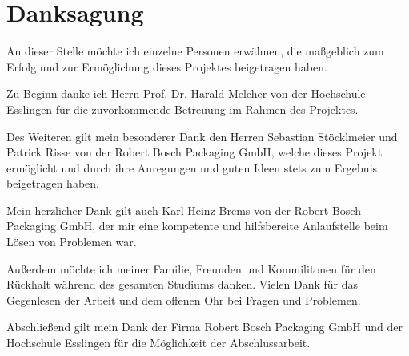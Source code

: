 \chapter*{Danksagung}
\thispagestyle{empty}

An dieser Stelle möchte ich einzelne Personen erwähnen, die maßgeblich zum Erfolg und zur Ermöglichung dieses Projektes
beigetragen haben.

Zu Beginn danke ich Herrn Prof. Dr. Harald Melcher von der Hochschule Esslingen für die zuvorkommende Betreuung im Rahmen
des Projektes.

Des Weiteren gilt mein besonderer Dank den Herren Sebastian Stöcklmeier und Patrick Risse von der Robert Bosch Packaging
GmbH, welche dieses Projekt ermöglicht und durch ihre Anregungen und guten Ideen stets zum Ergebnis beigetragen haben.

Mein herzlicher Dank gilt auch Karl-Heinz Brems von der Robert Bosch Packaging GmbH, der mir eine kompetente und
hilfsbereite Anlaufstelle beim Lösen von Problemen war.

Außerdem möchte ich meiner Familie, Freunden und Kommilitonen für den Rückhalt während des gesamten Studiums danken.
Vielen Dank für das Gegenlesen der Arbeit und dem offenen Ohr bei Fragen und Problemen.

Abschließend gilt mein Dank der Firma Robert Bosch Packaging GmbH und der Hochschule Esslingen für die Möglichkeit der
Abschlussarbeit.